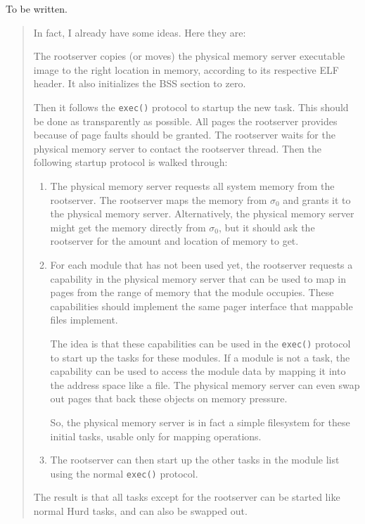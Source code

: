 \documentclass[9pt,a4paper]{extarticle}
\newenvironment{comment}{\footnotesize \begin{quote}}{\end{quote}}
\begin{document}
To be written.

\begin{comment}
  In fact, I already have some ideas.  Here they are:
  
  The rootserver copies (or moves) the physical memory server
  executable image to the right location in memory, according to its
  respective ELF header.  It also initializes the BSS section to zero.
  
  Then it follows the \texttt{exec()} protocol to startup the new
  task.  This should be done as transparently as possible.  All pages
  the rootserver provides because of page faults should be granted.
  The rootserver waits for the physical memory server to contact the
  rootserver thread.  Then the following startup protocol is walked
  through:

  \begin{enumerate}
  \item The physical memory server requests all system memory from the
    rootserver.  The rootserver maps the memory from $\sigma_0$ and
    grants it to the physical memory server.  Alternatively, the
    physical memory server might get the memory directly from
    $\sigma_0$, but it should ask the rootserver for the amount and
    location of memory to get.
    
  \item For each module that has not been used yet, the rootserver
    requests a capability in the physical memory server that can be
    used to map in pages from the range of memory that the module
    occupies.  These capabilities should implement the same pager
    interface that mappable files implement.
    
    The idea is that these capabilities can be used in the
    \texttt{exec()} protocol to start up the tasks for these modules.
    If a module is not a task, the capability can be used to access
    the module data by mapping it into the address space like a file.
    The physical memory server can even swap out pages that back these
    objects on memory pressure.
    
    So, the physical memory server is in fact a simple filesystem for
    these initial tasks, usable only for mapping operations.
    
  \item The rootserver can then start up the other tasks in the module
    list using the normal \texttt{exec()} protocol.
  \end{enumerate}
  
  The result is that all tasks except for the rootserver can be
  started like normal Hurd tasks, and can also be swapped out.
\end{comment}
\end{document}

